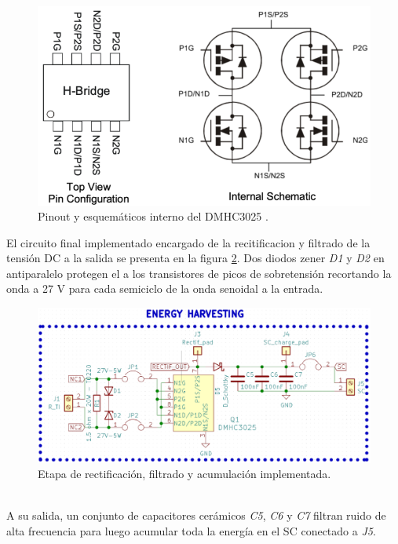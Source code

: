 \begin{figure}[h]
	\centering
	\includegraphics[width=0.8\linewidth]{Figures/esquematico_interno_rctificador_mosfet}
	\caption{Pinout y esquemáticos interno del DMHC3025 \citep{dmhc3025}.}
	\label{fig:esquematicointernorctificadormosfet}
\end{figure}
El circuito final implementado encargado de la recitificacion y filtrado de la tensión DC a la salida se presenta en la figura \ref{fig:ctorectificacionfiltrado}. Dos diodos zener \textit{D1} y \textit{D2} en antiparalelo protegen el a los transistores  de picos de sobretensión recortando la onda a 27 V para cada semiciclo de la onda senoidal a la entrada.\\
\begin{figure}
	\centering
	\includegraphics[width=0.8\linewidth]{Figures/cto_rectificacion_filtrado}
	\caption{Etapa de rectificación, filtrado y acumulación implementada.}
	\label{fig:ctorectificacionfiltrado}
\end{figure}\\
A su salida, un conjunto de capacitores cerámicos \textit{C5}, \textit{C6} y \textit{C7} filtran ruido de alta frecuencia para luego acumular toda la energía en el SC conectado a \textit{J5}.\\

